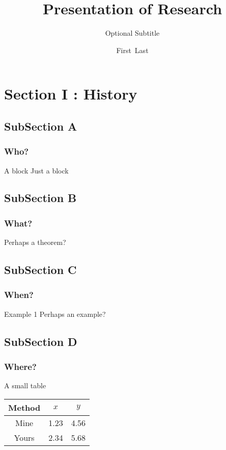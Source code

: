\documentclass[unknownkeysallowed,14pt]{beamer}
\title[My Research] %
{Presentation of Research}
\subtitle{Optional Subtitle} %
\author[First Last] %
{First~Last}
\institute[NCSU]
{
  Department of Statistics\\%
  North Carolina State University
}
\begin{document}
\begin{frame}
  \titlepage
\end{frame}

\section{Section I : History}

\subsection{SubSection A}

\begin{frame}
  \frametitle{Who?}
  \begin{block}{A block}
  Just a block
  \end{block}
\end{frame}

\subsection{SubSection B}
\begin{frame}
  \frametitle{What?}
  \begin{theorem}
  Perhaps a theorem?
  \end{theorem}
\end{frame}

\subsection{SubSection C}
\begin{frame}
  \frametitle{When?}
  \begin{exampleblock}{Example 1}
  Perhaps an example?
  \end{exampleblock}
\end{frame}

\subsection{SubSection D}
\begin{frame}
  \frametitle{Where?}
  \begin{block}{A small table}
  \begin{center}
  \begin{tabular}{ccc}
  \toprule
  Method & $x$ & $y$ \\
  \midrule
  Mine  & 1.23 & 4.56 \\
  Yours & 2.34 & 5.68 \\
  \bottomrule
  \end{tabular}
  \end{center}
  \end{block}
\end{frame}
\end{document}
